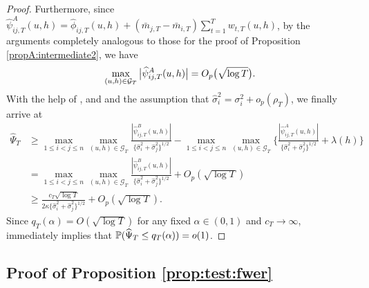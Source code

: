 \documentclass[a4paper,12pt]{article}
\makeatletter
\renewcommand{\eqref}[1]{\tagform@{\ref{#1}}}
\makeatother
\begin{document}
\begin{proof}
Furthermore, since $\widehat\psi_{ij,T}^A(u, h) = \widehat\phi_{ij,T}(u, h) + (\bar{m}_{j, T} - \bar{m}_{i, T}) \sum_{t=1}^T w_{t, T}(u, h)$, by the arguments completely analogous to those for the proof of Proposition \ref{propA:intermediate2}, we have
\begin{align}\label{eqA:power:psiA}
\max_{(u, h) \in \mathcal{G}_T} \big|\widehat\psi_{ij,T}^A(u, h)\big|  = O_p\big(\sqrt{\log T}\big).
\end{align}
With the help of \eqref{eqA:power:psiB}, \eqref{eqA:power:psiA} and \eqref{eqA:power:lambda} and the assumption that $\widehat{\sigma}^2_i = \sigma^2_i + o_p(\rho_T)$, we finally arrive at 
\begin{align}
\widehat{\Psi}_T  & \ge \max_{1 \le i < j \le n} \max_{(u,h) \in \mathcal{G}_T} \frac{|\widehat{\psi}_{ij, T}^B(u,h)|}{\{\widehat{\sigma}_i^2 + \widehat{\sigma}_j^2\}^{1/2}} - \max_{1 \le i < j \le n} \max_{(u,h) \in \mathcal{G}_T} \bigg\{ \frac{|\widehat{\psi}_{ij, T}^A(u,h)|}{\{\widehat{\sigma}^2_i + \widehat{\sigma}_j^2\}^{1/2}} + \lambda(h) \bigg\} \nonumber \\
 & = \max_{1 \le i < j \le n} \max_{(u,h) \in \mathcal{G}_T} \frac{|\widehat{\psi}_{ij, T}^B(u,h)|}{\{\widehat{\sigma}_i^2 + \widehat{\sigma}_j^2\}^{1/2}} + O_p(\sqrt{\log T}) \nonumber \\
 & \ge \frac{c_T \sqrt{\log T}}{2 \kappa \{\widehat{\sigma}_i^2 + \widehat{\sigma}_j^2\}^{1/2}} + O_p(\sqrt{\log T}). \label{eq5-proof-prop-test-power}
\end{align}  
Since $q_T(\alpha) = O(\sqrt{\log T})$ for any fixed $\alpha \in (0,1)$ and $c_T \to \infty$, \eqref{eq5-proof-prop-test-power} immediately implies that $\mathbb{P}(\widehat{\Psi}_T \le q_T(\alpha)) = o(1)$. 
\end{proof}

\subsection{Proof of Proposition \ref{prop:test:fwer}}\label{subsec:app:fwer}
\end{document}
